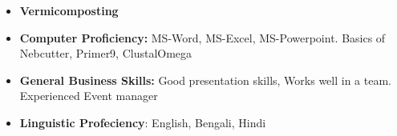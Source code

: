 \documentclass[11pt,a4paper,sans]{moderncv}
\begin{document}
\vspace{6pt}

\begin{itemize}

\item \textbf{Vermicomposting}
\vspace{6pt}
\item \textbf{Computer Proficiency:} MS-Word, MS-Excel, MS-Powerpoint. Basics of Nebcutter, Primer9, ClustalOmega

\vspace{6pt}


\item \textbf{General Business Skills:} Good presentation skills, Works well in a team. Experienced Event manager
\vspace{6pt}
\item \textbf{Linguistic Profeciency}: English, Bengali, Hindi
\end{itemize}
\end{document}
